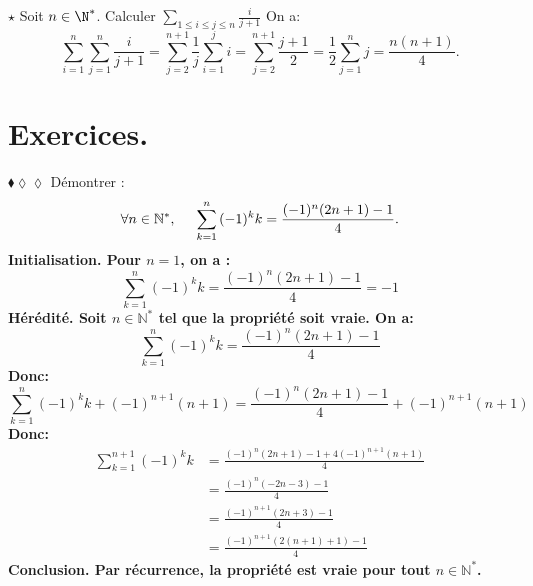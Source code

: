 \documentclass[11pt]{article}
\begin{document}
\vspace*{-0.9cm}

\begin{ex}{$\star$}{}
    Soit $n\in\N^*$. Calculer $\sum\limits_{1\leq i\leq j\leq n}\frac{i}{j+1}$
    \tcblower
    On a:
    \begin{equation*}
        \sum_{i=1}^n\sum_{j=1}^n\frac{i}{j+1}=\sum_{j=2}^{n+1}\frac{1}{j}\sum_{i=1}^ji=\sum_{j=2}^{n+1}\frac{j+1}{2}=\frac{1}{2}\sum_{j=1}^nj=\frac{n(n+1)}{4}.
    \end{equation*}
\end{ex}

\section{Exercices.}

\begin{exercice}{$\blacklozenge\lozenge\lozenge$}{}
    Démontrer :
    \begin{equation*}
        \forall{n}\in\mathbb{N}^*,\hspace{0.5cm} \sum\limits^{n}_{k=1}{(-1)^kk} = \frac{(-1)^n(2n+1)-1}{4}.
    \end{equation*}
    \tcblower
    \bf{Initialisation.} Pour $n=1$, on a :
    \begin{equation*}
        \sum\limits^{n}_{k=1}{(-1)^kk} = \frac{(-1)^n(2n+1)-1}{4} = -1
    \end{equation*}
    \bf{Hérédité.} Soit $n\in\mathbb{N}^*$ tel que la propriété soit vraie. On a:
    \begin{equation*}
        \sum\limits^{n}_{k=1}{(-1)^kk} = \frac{(-1)^n(2n+1)-1}{4}
    \end{equation*}
    Donc:
    \begin{equation*}
        \sum\limits^{n}_{k=1}{(-1)^kk} + (-1)^{n+1}(n+1) = \frac{(-1)^n(2n+1)-1}{4} +(-1)^{n+1}(n+1)
    \end{equation*}
    Donc:
    \begin{equation*}
        \begin{aligned}
            \sum\limits^{n+1}_{k=1}(-1)^kk 
            &= \frac{(-1)^n(2n+1)-1+4(-1)^{n+1}(n+1)}{4}\\
            &=\frac{(-1)^n(-2n - 3)-1}{4}\\
            &=\frac{(-1)^{n+1}(2n+3)-1}{4}\\
            &=\frac{(-1)^{n+1}(2(n+1)+1)-1}{4}
        \end{aligned}
    \end{equation*}
    \bf{Conclusion.} Par récurrence, la propriété est vraie pour tout $n\in\mathbb{N}^*$.
\end{exercice}
\end{document}
